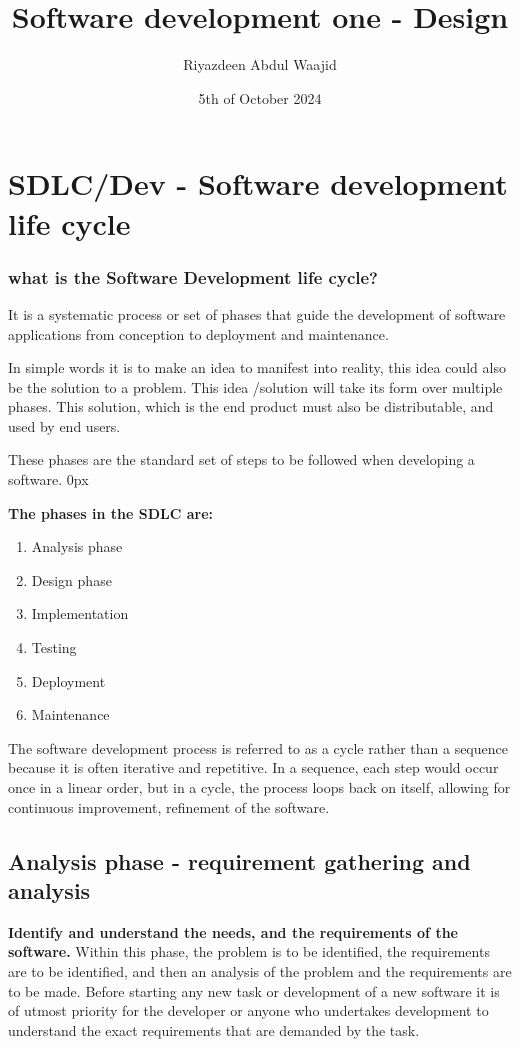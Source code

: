 \documentclass[a4paper]{article}
\title{Software development one - Design}
\author{Riyazdeen Abdul Waajid}
\date{5th of October 2024}
\begin{document}
\maketitle
\tableofcontents    
\newpage    
\section{SDLC/Dev - Software development life cycle}
\subsubsection{\textbf{what is the Software Development life cycle?}}
It is a systematic process or set of phases that guide the development of software applications from conception to deployment and maintenance. 

In simple words it is to make an idea to manifest into reality, this idea could also
be the solution to a problem. This idea /solution will take its form over multiple
phases. This solution, which is the end product must also be distributable, and used by end users.

These phases are the standard set of steps to be followed when developing a software.
\parindent 0px

\textbf{The phases in the SDLC are:}
\begin{enumerate}
    \item Analysis phase  
    \item Design phase  
    \item Implementation
    \item Testing
    \item Deployment
    \item Maintenance
        

\end{enumerate}

The software development process is referred to as a cycle rather than a sequence because it is often iterative and repetitive.
In a sequence, each step would occur once in a linear order, but in a cycle, the process loops back on itself, allowing for 
continuous improvement, refinement of the software.
\subsection{Analysis phase - requirement gathering and analysis}
\textbf{Identify and understand the needs, and the requirements of the software.} Within this phase, the problem is to be
identified, the requirements are to be identified, and then an analysis of the problem
and the requirements are to be made.
Before starting any new task or development of a new software it is of utmost priority for the developer or anyone who 
undertakes development to understand
the exact requirements that are demanded by the task. 
\end{document}
